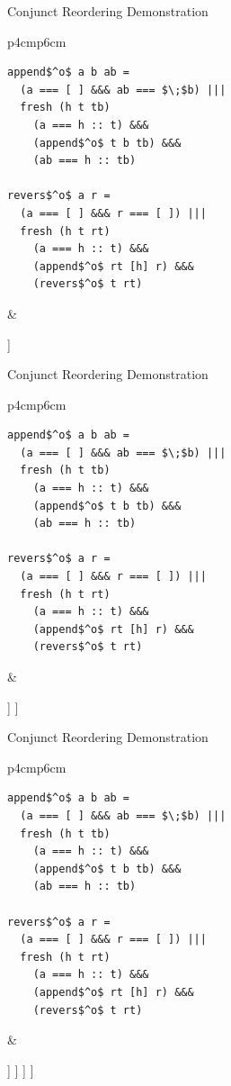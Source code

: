 \documentclass{beamer}
\theoremstyle{definition}
\theoremstyle{plain} %
\begin{document}
\begin{frame}[fragile]{Conjunct Reordering Demonstration}
  \begin{tabular}{p{4cm}p{6cm}}
    \begin{lstlisting}
append$^o$ a b ab =		
  (a === [ ] &&& ab === $\;$b) |||
  fresh (h t tb) 
    (a === h :: t) &&&
    (append$^o$ t b tb) &&&
    (ab === h :: tb)  
  
revers$^o$ a r =	
  (a === [ ] &&& r === [ ]) |||
  fresh (h t rt) 
    (a === h :: t) &&&
    (append$^o$ rt [h] r) &&&
    (revers$^o$ t rt)
\end{lstlisting}
&
\begin{center}
   \Tree [.{\lstinline|revers$^o\; [1,\,2,\,3]\; r$|}  [.{$[1,\,2,\,3]\not\equiv [\;]$} ] [.{$[1,\,2,\,3]\equiv h_0::t_0$} ] ]
\end{center}
\end{tabular}
\end{frame}

\begin{frame}[fragile]{Conjunct Reordering Demonstration}
  \begin{tabular}{p{4cm}p{6cm}}
    \begin{lstlisting}
append$^o$ a b ab =		
  (a === [ ] &&& ab === $\;$b) |||
  fresh (h t tb) 
    (a === h :: t) &&&
    (append$^o$ t b tb) &&&
    (ab === h :: tb)  
  
revers$^o$ a r =	
  (a === [ ] &&& r === [ ]) |||
  fresh (h t rt) 
    (a === h :: t) &&&
    (append$^o$ rt [h] r) &&&
    (revers$^o$ t rt)
\end{lstlisting}
&
\begin{center}
  \Tree [.{\lstinline|revers$^o\; [1,\,2,\,3]\; r$|}
    [.{$[1,\,2,\,3]\not\equiv [\;]$} ]
    [.{$[1,\,2,\,3]\equiv h_0::t_0$}
      [.{\lstinline|append$^o\;rt_0\;[1]\;r$|} ]
    ]
  ]
\end{center}
\end{tabular}
\end{frame}

\begin{frame}[fragile]{Conjunct Reordering Demonstration}
  \begin{tabular}{p{4cm}p{6cm}}
    \begin{lstlisting}
append$^o$ a b ab =		
  (a === [ ] &&& ab === $\;$b) |||
  fresh (h t tb) 
    (a === h :: t) &&&
    (append$^o$ t b tb) &&&
    (ab === h :: tb)  
  
revers$^o$ a r =	
  (a === [ ] &&& r === [ ]) |||
  fresh (h t rt) 
    (a === h :: t) &&&
    (append$^o$ rt [h] r) &&&
    (revers$^o$ t rt)
\end{lstlisting}
&
\begin{center}
  \Tree [.{\lstinline|revers$^o\; [1,\,2,\,3]\; r$|}
    [.{$[1,\,2,\,3]\not\equiv [\;]$} ]
    [.{$[1,\,2,\,3]\equiv h_0::t_0$}
      [.{\lstinline|append$^o\;rt_0\;[1]\;r$|}
        [.{$\dots$} ]
        [.{$rt_0\equiv h_1::t_1$} [.{\lstinline|append$^o\;t_1\;[1]\;tb_0$|} ] ]
      ]
    ]
  ]
\end{center}
\end{tabular}
\end{frame}
\end{document}
